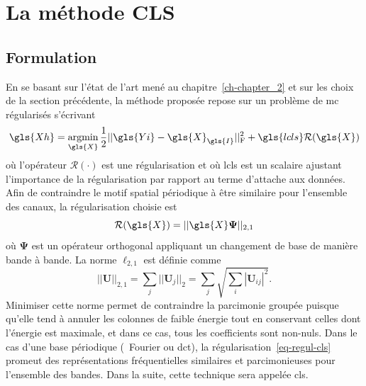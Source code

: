 \newpage
%
\section{La méthode CLS}

\subsection{Formulation}\label{sec-formulation-cls}

En se basant sur l'état de l'art mené au chapitre~\ref{ch-chapter_2} et sur les choix de la section précédente, la méthode proposée repose sur un problème de \gls{mc} régularisés s'écrivant 
\begin{equation}\label{eq-cls-formulation}
    \gls{Xh}=\argmin_{\gls{X}} \frac{1}{2} \frobnorm{\gls{Yi} - \gls{X}_{\gls{I}}} + \gls{lcls} \mathcal{R}(\gls{X})
\end{equation}
où l'opérateur $\mathcal{R}(\cdot)$ est une régularisation et où \gls{lcls} est un scalaire ajustant l'importance de la régularisation par rapport au terme d'attache aux données. Afin de contraindre le motif spatial périodique à être similaire pour l'ensemble des canaux, la régularisation choisie est
\begin{equation}\label{eq-regul-cls}
    \mathcal{R}(\gls{X}) = ||\gls{X}\boldsymbol\Psi||_{2, 1}
\end{equation}
où $\boldsymbol\Psi$ est un opérateur orthogonal appliquant un changement de base de manière bande à bande. La norme $\ell_{2, 1}$ est définie comme~\cite{kowalski2009sparse}%
\begin{equation}
||\mathbf{U}||_{2, 1} = \sum_j||\mathbf{U}_j||_2 = \sum_j \sqrt{\sum_i |\mathbf{U}_{ij}|^2}.
\end{equation}
Minimiser cette norme permet de contraindre la parcimonie groupée puisque qu'elle tend à annuler les colonnes de faible énergie tout en conservant celles dont l'énergie est maximale, et dans ce cas, tous les coefficients sont non-nuls. Dans le cas d'une base périodique (\eg\ Fourier ou \gls{dct}), la régularisation~\eqref{eq-regul-cls} promeut des représentations fréquentielles similaires et parcimonieuses pour l'ensemble des bandes. Dans la suite, cette technique sera appelée \gls{cls}.

